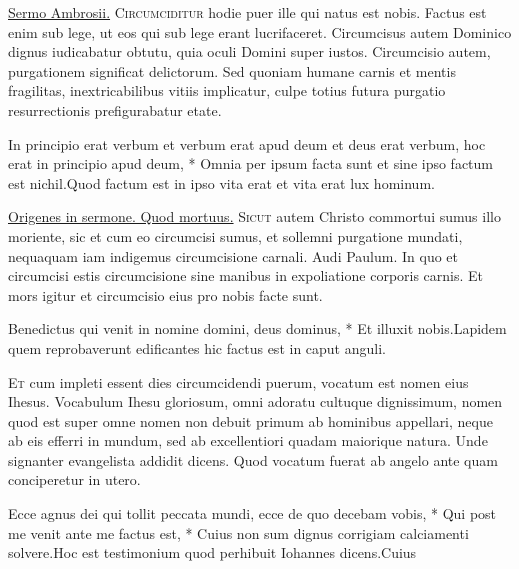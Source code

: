 \begin{multicols*}{2}
 \ul{Sermo Ambrosii.} {\color{Red} }
\lettrine[lines=2]{\zallmancaps \color{Red} C}{ircumciditur} hodie puer ille qui natus est nobis. Factus est enim sub lege, ut eos qui sub lege erant lucrifaceret.
Circumcisus autem Dominico dignus iudicabatur obtutu, %
quia oculi Domini super iustos. Circumcisio autem, purgationem significat delictorum. Sed quoniam humane carnis et mentis fragilitas, inextricabilibus vitiis implicatur, culpe totius futura purgatio resurrectionis prefigurabatur etate.
\begin{responsory}[in-principio]
{In principio erat verbum et verbum erat apud deum et deus erat verbum, hoc erat in principio apud deum, * Omnia per ipsum facta sunt et sine ipso factum est nichil.}{Quod factum est in ipso vita erat et vita erat lux hominum.}
\end{responsory}
 \ul{Origenes in sermone. Quod mortuus.} {\color{Red} }
\lettrine[lines=2]{\zallmancaps \color{Blue} S}{icut} autem Christo commortui sumus illo moriente, sic et cum eo circumcisi sumus, et sollemni purgatione mundati, nequaquam iam indigemus circumcisione carnali. Audi Paulum. %
In quo et circumcisi estis circumcisione sine manibus in expoliatione corporis carnis. Et mors igitur et circumcisio eius pro nobis facte sunt.
\begin{responsory}
{Benedictus qui venit in nomine domini, deus dominus, * Et illuxit nobis.}{Lapidem quem reprobaverunt edificantes hic factus est in caput anguli.}
\end{responsory}
\lettrine[lines=2]{\zallmancaps \color{Red} E}{t} cum impleti essent dies circumcidendi puerum, vocatum est nomen eius Ihesus. Vocabulum Ihesu gloriosum, omni adoratu cultuque dignissimum, nomen quod est super omne nomen non debuit primum ab hominibus appellari, neque ab eis efferri in mundum, sed ab excellentiori quadam maiorique natura. Unde signanter evangelista addidit dicens. Quod vocatum fuerat ab angelo ante quam conciperetur in utero.
\begin{responsory-final}
{Ecce agnus dei qui tollit peccata mundi, ecce de quo decebam vobis, * Qui post me venit ante me factus est, * Cuius non sum dignus corrigiam calciamenti solvere.}{Hoc est testimonium quod perhibuit Iohannes dicens.}{Cuius}

\end{responsory-final}
\end{multicols*}

